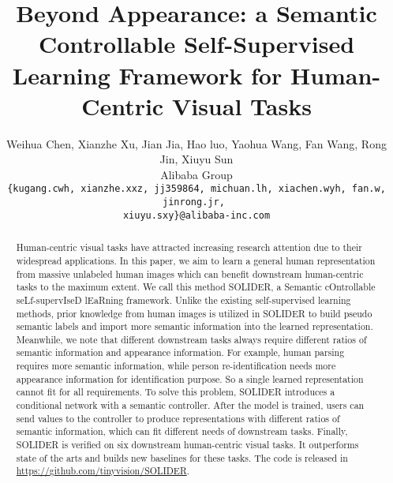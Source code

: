 \documentclass[10pt,twocolumn,letterpaper]{article}
\begin{document}
\title{Beyond Appearance: a Semantic Controllable Self-Supervised Learning Framework for Human-Centric Visual Tasks}



\author{Weihua Chen, Xianzhe Xu, Jian Jia, Hao luo, Yaohua Wang, Fan Wang, Rong Jin, Xiuyu Sun\footnotemark[2]\\
Alibaba Group\\
{\tt\small \{kugang.cwh, xianzhe.xxz, jj359864, michuan.lh, xiachen.wyh, fan.w, jinrong.jr, } \\
{\tt\small xiuyu.sxy\}@alibaba-inc.com}
}
\maketitle
\renewcommand{\thefootnote}{\fnsymbol{footnote}}
\renewcommand{\thefootnote}{\arabic{footnote}}

\begin{abstract}
Human-centric visual tasks have attracted increasing research attention due to their widespread applications. 
In this paper, we aim to learn a general human representation from massive unlabeled human images which can benefit downstream human-centric tasks to the maximum extent. 
We call this method SOLIDER, a Semantic cOntrollable seLf-supervIseD lEaRning framework.  
Unlike the existing self-supervised learning methods, prior knowledge from human images is utilized in SOLIDER to build pseudo semantic labels and import more semantic information into the learned representation.
Meanwhile, we note that different downstream tasks always require different ratios of semantic information and appearance information. 
For example, human parsing requires more semantic information, while person re-identification needs more appearance information for identification purpose.
So a single learned representation cannot fit for all requirements.
To solve this problem, SOLIDER introduces a conditional network with a semantic controller. After the model is trained, users can send values to the controller to produce representations with different ratios of semantic information, which can fit different needs of downstream tasks.
Finally, SOLIDER is verified on six downstream human-centric visual tasks. It outperforms state of the arts and builds new baselines for these tasks.
The code is released in \href{https://github.com/tinyvision/SOLIDER}{https://github.com/tinyvision/SOLIDER}.
\end{abstract}
\vspace{-0.2cm}
\end{document}
